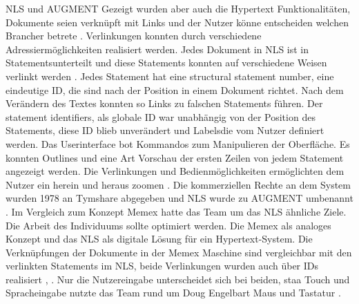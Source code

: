 \begin{section}{NLS und AUGMENT}
Gezeigt wurden aber auch die Hypertext Funktionalitäten, Dokumente seien verknüpft mit Links und der Nutzer könne entscheiden welchen \glqq Branch\grqq{ }er betrete \cite{MotherOfDemo1968}. Verlinkungen konnten durch verschiedene Adressiermöglichkeiten realisiert werden. Jedes Dokument in NLS ist in \glqq Statements\grqq{ }unterteilt und diese Statements konnten auf verschiedene Weisen verlinkt werden \cite{Engelbart1984}. Jedes Statement hat eine \glqq structural statement number\grqq{ }, eine eindeutige ID, die sind nach der Position in einem Dokument richtet. Nach dem Verändern des Textes konnten so Links zu falschen Statements führen. Der \glqq statement identifiers\grqq{ }, als globale ID war unabhängig von der Position des Statements, diese ID blieb unverändert und \glqq Labels\grqq{ }die vom Nutzer definiert werden. Das Userinterface bot Kommandos zum Manipulieren der Oberfläche. Es konnten Outlines und eine Art Vorschau der ersten Zeilen von jedem Statement angezeigt werden. Die Verlinkungen und Bedienmöglichkeiten ermöglichten dem Nutzer ein \glqq herein und heraus zoomen \grqq{ }\cite{MotherOfDemo1968}. Die kommerziellen Rechte an dem System wurden 1978 an Tymshare abgegeben und NLS wurde zu AUGMENT umbenannt \cite{Engelbart1984}. Im Vergleich zum Konzept Memex hatte das Team um das NLS ähnliche Ziele. Die Arbeit des Individuums sollte optimiert werden. Die Memex als analoges Konzept und das NLS als digitale Lösung für ein Hypertext-System. Die Verknüpfungen der Dokumente in der Memex Maschine sind vergleichbar mit den verlinkten Statements im NLS, beide Verlinkungen wurden auch über IDs realisiert \cite{Engelbart1984}, \cite{Bush1945}. Nur die Nutzereingabe unterscheidet sich bei beiden, staa Touch und Spracheingabe \cite{Bush1945} nutzte das Team rund um Doug Engelbart Maus und Tastatur \cite{MotherOfDemo1968}.

\end{section}

